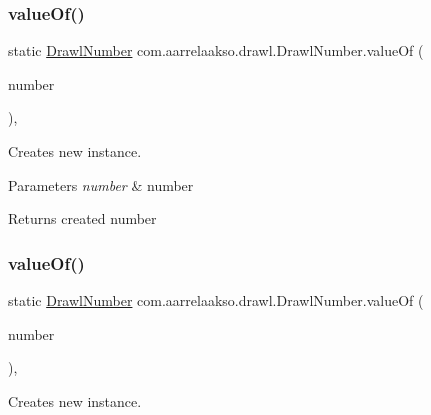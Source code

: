 \subsubsection{\texorpdfstring{value\+Of()}{valueOf()}\hspace{0.1cm}{\footnotesize\ttfamily [2/4]}}
{\footnotesize\ttfamily static \hyperlink{classcom_1_1aarrelaakso_1_1drawl_1_1_drawl_number}{Drawl\+Number} com.\+aarrelaakso.\+drawl.\+Drawl\+Number.\+value\+Of (\begin{DoxyParamCaption}\item[{double}]{number }\end{DoxyParamCaption})\hspace{0.3cm}{\ttfamily [static]}, {\ttfamily [protected]}}



Creates new instance. 


\begin{DoxyParams}{Parameters}
{\em number} & number \\
\hline
\end{DoxyParams}
\begin{DoxyReturn}{Returns}
created number 
\end{DoxyReturn}
\mbox{\label{classcom_1_1aarrelaakso_1_1drawl_1_1_drawl_number_afc0860879449c17f5410d0a1353d4e5b}} 
\subsubsection{\texorpdfstring{value\+Of()}{valueOf()}\hspace{0.1cm}{\footnotesize\ttfamily [3/4]}}
{\footnotesize\ttfamily static \hyperlink{classcom_1_1aarrelaakso_1_1drawl_1_1_drawl_number}{Drawl\+Number} com.\+aarrelaakso.\+drawl.\+Drawl\+Number.\+value\+Of (\begin{DoxyParamCaption}\item[{Big\+Decimal}]{number }\end{DoxyParamCaption})\hspace{0.3cm}{\ttfamily [static]}, {\ttfamily [protected]}}



Creates new instance. 


